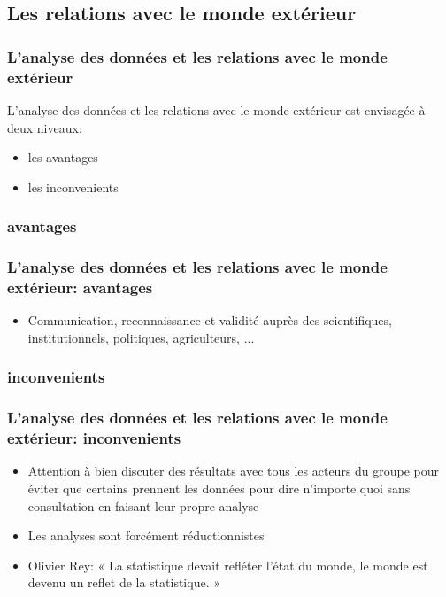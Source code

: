 \subsection{Les relations avec le monde extérieur} 

\begin{frame}
\frametitle{L'analyse des données et les relations avec le monde extérieur}

L'analyse des données et les relations avec le monde extérieur est envisagée à deux niveaux:

\begin{itemize}
\item les avantages
\item les inconvenients
\end{itemize}

\end{frame}

\subsubsection{avantages}

\begin{frame}
\frametitle{L'analyse des données et les relations avec le monde extérieur: avantages}

\begin{itemize}
\item Communication, reconnaissance et validité auprès des scientifiques, institutionnels, politiques, agriculteurs, ...
\end{itemize}

\end{frame}


\subsubsection{inconvenients}

\begin{frame}
\frametitle{L'analyse des données et les relations avec le monde extérieur: inconvenients}

\begin{itemize}
\item Attention à bien discuter des résultats avec tous les acteurs du groupe pour éviter que certains prennent les données pour dire n'importe quoi sans consultation en faisant leur propre analyse
\item Les analyses sont forcément réductionnistes
\item Olivier Rey: « La statistique devait refléter l’état du monde, le monde est devenu un reflet de la statistique. »

\end{itemize}

\end{frame}


